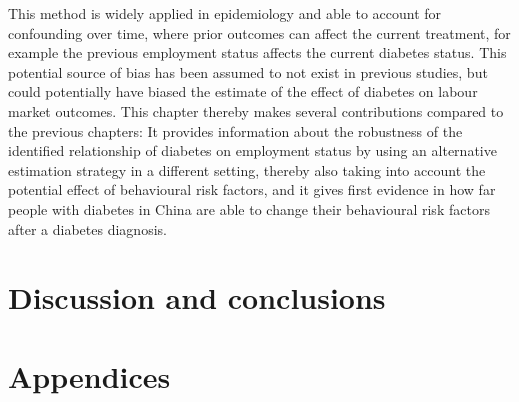 This method is widely applied in epidemiology and able to account for confounding over time, where prior outcomes can affect the current treatment, for example the previous employment status affects the current diabetes status. This potential source of bias has been assumed to not exist in previous studies, but could potentially have biased the estimate of the effect of diabetes on labour market outcomes. This chapter thereby makes several contributions compared to the previous chapters: It provides information about the robustness of the identified relationship of diabetes on employment status by using an alternative estimation strategy in a different setting, thereby also taking into account the potential effect of behavioural risk factors, and it gives first evidence in how far people with diabetes in China are able to change their behavioural risk factors after a diabetes diagnosis.


\acresetall  %

\acresetall  %
\chapter{\label{cha:Discussion}Discussion and conclusions} 
\acresetall  %

\printbibliography[heading=bibintoc]
\chapter*{\label{cha:Appendix}Appendices}
\renewcommand{\thechapter}{{\Roman{chapter}}} 
\renewcommand{\thetable}{A\arabic{table}} %
\renewcommand{\thefigure}{A\arabic{figure}} %
\setcounter{chapter}{0}  %
\setcounter{table}{0}
\setcounter{figure}{0}

\cleardoublepage
          
